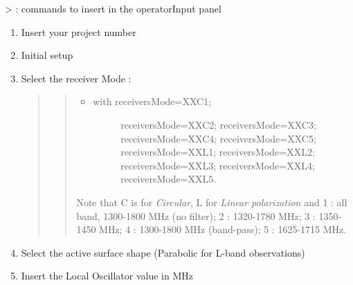 \documentclass[letterpaper,10pt,english]{sphinxmanual}
\begin{document}
\textgreater{} : commands to insert in the operatorInput panel
\begin{enumerate}
\item {} 
Insert your project number
\begin{quote}

\end{quote}

\item {} 
Initial setup
\begin{quote}


\end{quote}

\item {} 
Select the receiver Mode :
\begin{quote}

\begin{quote}
\begin{itemize}
\item {} \begin{description}
\item[{with receiversMode=XXC1;}] \leavevmode
receiversMode=XXC2;
receiversMode=XXC3;
receiversMode=XXC4;
receiversMode=XXC5;
receiversMode=XXL1;
receiversMode=XXL2;
receiversMode=XXL3;
receiversMode=XXL4;
receiversMode=XXL5.

\end{description}

\end{itemize}

Note that C is for \emph{Circular}, L for \emph{Linear polarization} and
1 : all band, 1300-1800 MHz (no filter);
2 : 1320-1780 MHz;
3 : 1350-1450 MHz;
4 : 1300-1800 MHz (band-pass);
5 : 1625-1715 MHz.
\end{quote}
\end{quote}

\item {} 
Select the active surface shape (Parabolic for L-band observations)
\begin{quote}

\end{quote}

\item {} 
Insert the Local Oscillator value in MHz
\begin{quote}


\end{quote}
\end{enumerate}
\end{document}
